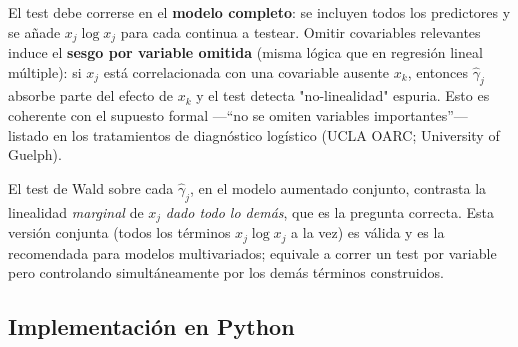 \documentclass[11pt]{article}
\theoremstyle{plain}
\theoremstyle{definition}
\theoremstyle{remark}
\begin{document}
El test debe correrse en el \textbf{modelo completo}: se incluyen todos los
predictores y se añade $x_j\log x_j$ para cada continua a testear. Omitir
covariables relevantes induce el \textbf{sesgo por variable omitida} (misma
lógica que en regresión lineal múltiple): si $x_j$ está correlacionada con una
covariable ausente $x_k$, entonces $\hat\gamma_j$ absorbe parte del efecto de
$x_k$ y el test detecta "no-linealidad" espuria. Esto es coherente con el
supuesto formal ---``no se omiten variables importantes''--- listado en los
tratamientos de diagnóstico logístico (UCLA OARC; University of Guelph).

El test de Wald sobre cada $\hat\gamma_j$, en el modelo aumentado conjunto,
contrasta la linealidad \emph{marginal} de $x_j$ \emph{dado todo lo demás}, que
es la pregunta correcta. Esta versión conjunta (todos los términos $x_j\log x_j$
a la vez) es válida y es la recomendada para modelos multivariados; equivale a
correr un test por variable pero controlando simultáneamente por los demás
términos construidos.

\subsection{Implementación en Python}
\end{document}
